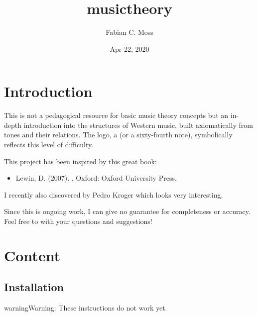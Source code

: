 \documentclass[letterpaper,10pt,english]{sphinxmanual}
\title{musictheory}
\date{Apr 22, 2020}
\author{Fabian C.\@{} Moss}
\begin{document}
\pagestyle{empty}
\sphinxmaketitle
\pagestyle{plain}
\sphinxtableofcontents
\pagestyle{normal}
\label{\detokenize{index::doc}}




\chapter{Introduction}
\label{\detokenize{index:introduction}}
This is not a pedagogical resource for basic music theory concepts
but an in-depth introduction into the structures of Western music,
built axiomatically from tones and their relations.
The logo, a  (or a sixty-fourth note),
symbolically reflects this level of difficulty.

This project has been inspired by this great book:
\begin{itemize}
\item {} 
Lewin, D. (2007). .
Oxford: Oxford University Press.

\end{itemize}

I recently also discovered  by Pedro Kroger
which looks very interesting.

Since this is ongoing work, I can give no guarantee for completeness or accuracy.
Feel free to  with your questions and suggestions!


\chapter{Content}
\label{\detokenize{index:content}}

\section{Installation}
\label{\detokenize{install:installation}}\label{\detokenize{install::doc}}
\begin{sphinxadmonition}{warning}{Warning:}
These instructions do not work yet.
\end{sphinxadmonition}
\end{document}
